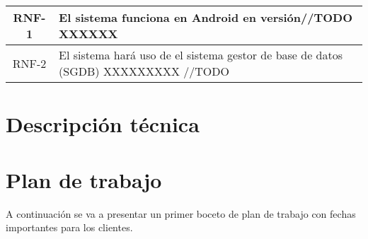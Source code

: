 \documentclass{article}
\begin{document}
\begin{table}[H]
    \centering
    \begin{tabular}{| c | p{30em} |}
        \hline
        RNF-1 & El sistema funciona en Android en versión//TODO XXXXXX  \\ \hline
        RNF-2 & El sistema hará uso de el sistema gestor de base de datos (SGDB) XXXXXXXXX //TODO \\ \hline
    \end{tabular}
\end{table}







\section{Descripción técnica}



\section{Plan de trabajo}
A continuación se va a presentar un primer boceto de plan de trabajo con fechas importantes para los clientes.
\end{document}
